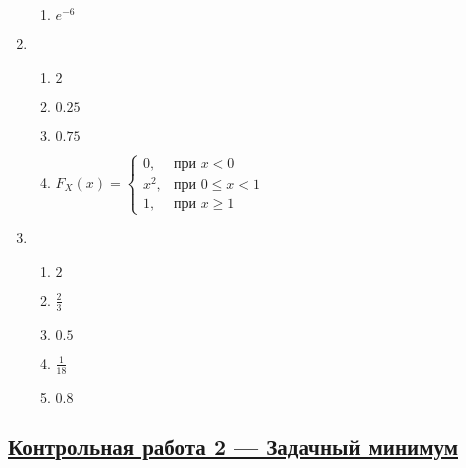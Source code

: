 \begin{multicols}{2}
\begin{enumerate}
\begin{enumerate}
		\item $e^{-6}$
	\end{enumerate}
	\item %
	\begin{enumerate}
		\item $2$
		\item $0.25$
		\item $0.75$
		\item
		$F_{X}(x) = \begin{cases}
		0, & \text{при } x < 0 \\
		x^2 , & \text{при } 0 \le x < 1 \\
		1, & \text{при }  x \geq 1
		\end{cases}$
	\end{enumerate}
	\item %
	\begin{enumerate}
		\item $2$
		\item $\frac{2}{3}$
		\item $0.5$
		\item $\frac{1}{18}$
		\item $0.8$
	\end{enumerate}
\end{enumerate}
\end{multicols}


\subsection[Кр 2]{\hyperref[sec:minimum_kr_02]{Контрольная работа 2 — Задачный минимум}}
\label{sec:sol_minimum_kr_02}



